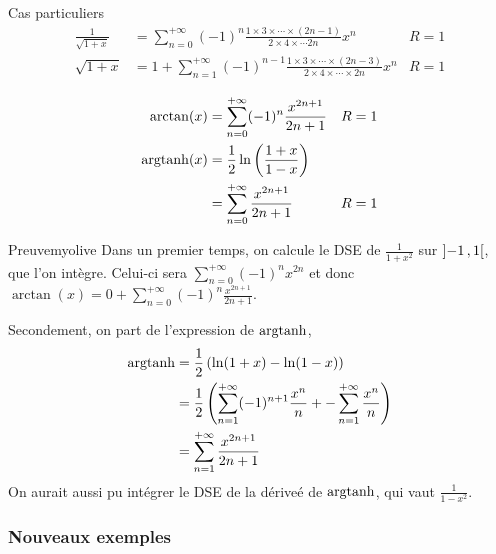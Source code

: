     \begin{coro}{Cas particuliers}{}
        \begin{align*}
            \frac{1}{\sqrt{1 + x}} &= \sum_{n=0}^{+\infty} (-1)^n \frac{1 \times 3 \times \cdots \times (2n-1)}{2 \times 4 \times \cdots 2n} x^n & R = 1 \\
            \sqrt{1 + x} &= 1 + \sum_{n=1}^{+\infty} (-1)^{n-1} \frac{1 \times 3 \times \cdots \times (2n-3)}{2 \times 4 \times \cdots \times 2n} x^n & R = 1
        \end{align*}
    \end{coro}

    \begin{prop}{}{}
        \begin{align*}
            \arctan(x) &= \sum_{n=0}^{+\infty} (-1)^n \frac{x^{2n+1}}{2n+1} & R = 1 \\
            \operatorname{argtanh}(x) &= \frac{1}{2} \ln\left(\frac{1 + x}{1 - x}\right) \\
            &= \sum_{n=0}^{+\infty} \frac{x^{2n+1}}{2n+1} & R = 1
        \end{align*}
    \end{prop}

    \begin{demo}{Preuve}{myolive}
        Dans un premier temps, on calcule le DSE de $\frac{1}{1 + x^2}$ sur $\left] -1 \, , 1 \right[$, que l’on intègre. Celui-ci sera $\sum_{n=0}^{+\infty} (-1)^n x^{2n}$ et donc $\arctan(x) = 0 + \sum_{n=0}^{+\infty} (-1)^n \frac{x^{2n+1}}{2n+1}$. 

        Secondement, on part de l’expression de $\operatorname{argtanh}$, 
        \begin{align*}
            \operatorname{argtanh} 
            &= \frac{1}{2} \left(\ln(1+x) - \ln(1 - x)\right) \\
            &= \frac{1}{2} \left(\sum_{n=1}^{+\infty} (-1)^{n+1} \frac{x^n}{n} +- \sum_{n=1}^{+\infty} \frac{x^n}{n} \right) \\
            &= \sum_{n=1}^{+\infty} \frac{x^{2n+1}}{2n+1}
        \end{align*}
        On aurait aussi pu intégrer le DSE de la dériveé de $\operatorname{argtanh}$, qui vaut $\frac{1}{1-x^2}$.
    \end{demo}

    \subsubsection{Nouveaux exemples}

